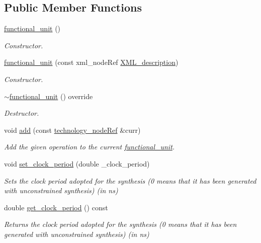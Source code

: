 \subsection*{Public Member Functions}
\begin{DoxyCompactItemize}
\item 
\hyperlink{structfunctional__unit_a5213b3603e952f9c8eb412e722b66598}{functional\+\_\+unit} ()
\begin{DoxyCompactList}\small\item\em Constructor. \end{DoxyCompactList}\item 
\hyperlink{structfunctional__unit_a803b16c20f69a433188d018cad20fff3}{functional\+\_\+unit} (const xml\+\_\+node\+Ref \hyperlink{structfunctional__unit_a5b8bbf88b9922ed54eeb7782c283b498}{X\+M\+L\+\_\+description})
\begin{DoxyCompactList}\small\item\em Constructor. \end{DoxyCompactList}\item 
\hyperlink{structfunctional__unit_a356a9b93866182523e867b92e8a2ffd6}{$\sim$functional\+\_\+unit} () override
\begin{DoxyCompactList}\small\item\em Destructor. \end{DoxyCompactList}\item 
void \hyperlink{structfunctional__unit_a8f9bce347984b438b96be67920000437}{add} (const \hyperlink{technology__node_8hpp_a33dd193b7bd6b987bf0d8a770a819fa7}{technology\+\_\+node\+Ref} \&curr)
\begin{DoxyCompactList}\small\item\em Add the given operation to the current \hyperlink{structfunctional__unit}{functional\+\_\+unit}. \end{DoxyCompactList}\item 
void \hyperlink{structfunctional__unit_a99dbc918a7d0b2a6ba20ac4161961a64}{set\+\_\+clock\+\_\+period} (double \+\_\+clock\+\_\+period)
\begin{DoxyCompactList}\small\item\em Sets the clock period adopted for the synthesis (0 means that it has been generated with unconstrained synthesis) (in ns) \end{DoxyCompactList}\item 
double \hyperlink{structfunctional__unit_a42c1f8deae0697b03a865e843c41f3fb}{get\+\_\+clock\+\_\+period} () const
\begin{DoxyCompactList}\small\item\em Returns the clock period adopted for the synthesis (0 means that it has been generated with unconstrained synthesis) (in ns) \end{DoxyCompactList}\item 

\end{DoxyCompactItemize}
